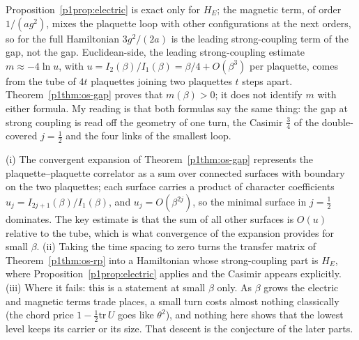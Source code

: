 \begin{remark}
Proposition~\ref{p1prop:electric} is exact only for $H_E$; the magnetic term, of order $1/(ag^2)$, mixes the plaquette
loop with other configurations at the next orders, so for the full Hamiltonian $3g^2/(2a)$ is the leading
strong-coupling term of the gap, not the gap. Euclidean-side, the leading strong-coupling estimate
$m\approx-4\ln u$, with $u=I_2(\beta)/I_1(\beta)=\beta/4+O(\beta^3)$ per plaquette, comes from the tube of $4t$
plaquettes joining two plaquettes $t$ steps apart. Theorem~\ref{p1thm:os-gap} proves that $m(\beta)>0$; it does not
identify $m$ with either formula. My reading is that both formulas say the same thing: the gap at strong coupling is
read off the geometry of one turn, the Casimir $\tfrac34$ of the double-covered $j=\tfrac12$ and the four links of the
smallest loop.
\end{remark}
\begin{sketch}
(i) The convergent expansion of Theorem~\ref{p1thm:os-gap} represents the plaquette--plaquette correlator as a sum over
connected surfaces with boundary on the two plaquettes; each surface carries a product of character coefficients
$u_j=I_{2j+1}(\beta)/I_1(\beta)$, and $u_j=O(\beta^{2j})$, so the minimal surface in $j=\tfrac12$ dominates. The key
estimate is that the sum of all other surfaces is $O(u)$ relative to the tube, which is what convergence of the
expansion provides for small $\beta$. (ii) Taking the time spacing to zero turns the transfer matrix of
Theorem~\ref{p1thm:os-rp} into a Hamiltonian whose strong-coupling part is $H_E$, where
Proposition~\ref{p1prop:electric} applies and the Casimir appears explicitly. (iii) Where it fails: this is a statement
at small $\beta$ only. As $\beta$ grows the electric and magnetic terms trade places, a small turn costs almost
nothing classically (the chord price $1-\tfrac12\mathrm{tr}\,U$ goes like $\theta^2$), and nothing here shows that the lowest level keeps its carrier
or its size. That descent is the conjecture of the later parts.
\end{sketch}
